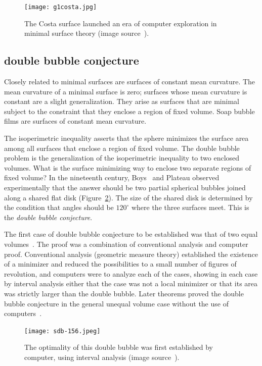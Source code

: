 \documentclass{llncs}
\begin{document}
\begin{figure}[h!]
  \centering
\texttt{[image: g1costa.jpg]}
  \caption{The Costa surface launched an era of computer exploration
in minimal surface theory (image source~\cite{costa}).}
\label{fig:costa}
\end{figure}



\subsection{double bubble conjecture}

Closely related to minimal surfaces are surfaces of constant mean
curvature.  The mean curvature of a minimal surface is zero; surfaces
whose mean curvature is constant are a slight generalization.  They
arise as surfaces that are minimal subject to the constraint that
they enclose a region of fixed volume.  Soap bubble films are
surfaces of constant mean curvature.  

The isoperimetric inequality asserts that the sphere minimizes the
surface area among all surfaces that enclose a region of fixed volume.
The double bubble problem is the generalization of the isoperimetric
inequality to two enclosed volumes.  What is the surface minimizing
way to enclose two separate regions of fixed volume?  In the
nineteenth century, Boys~\cite{Boy1890} and Plateau observed
experimentally that the answer should be two partial spherical bubbles
joined along a shared flat disk (Figure~\ref{fig:double}).  The size
of the shared disk is determined by the condition that angles should
be $120^\circ$ where the three surfaces meet.  This is the {\it double
  bubble conjecture}.

The first case of double bubble conjecture to be established was that
of two equal volumes~\cite{HHS95}.  The proof was a combination of
conventional analysis and computer proof.  Conventional analysis
(geometric measure theory) established the existence of a minimizer
and reduced the possibilities to a small number of figures of
revolution, and computers were to analyze each of the cases, showing
in each case by interval analysis either that the case was not a local
minimizer or that its area was strictly larger than the double bubble.
Later theorems proved the double bubble conjecture in the general
unequal volume case without the use of computers~\cite{HMRR}.

\begin{figure}[h!]
  \centering
\texttt{[image: sdb-156.jpeg]}
\caption{The optimality of this double bubble was first established by
  computer, using interval analysis (image source~\cite{double}).}
\label{fig:double}
\end{figure}
\end{document}
